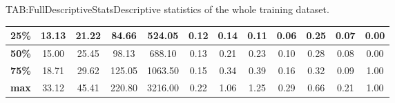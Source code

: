 \begin{landscape}
\begin{table}[Complete Descriptive Statistics]{TAB:FullDescriptiveStats}{Descriptive statistics of the whole training dataset.}
\begin{adjustbox}{width=1\linewidth}
\begin{tabular}{|c|*{11}{c|}}
                \hline
                \textbf{25\%}    & 13.13                           & 21.22                            & 84.66                              & 524.05                        & 0.12                                & 0.14                                 & 0.11                               & 0.06                                    & 0.25                              & 0.07                                       & 0.00                      \\
                \hline
                \textbf{50\%}    & 15.00                           & 25.45                            & 98.13                              & 688.10                        & 0.13                                & 0.21                                 & 0.23                               & 0.10                                    & 0.28                              & 0.08                                       & 0.00                      \\
                \hline
                \textbf{75\%}    & 18.71                           & 29.62                            & 125.05                             & 1063.50                       & 0.15                                & 0.34                                 & 0.39                               & 0.16                                    & 0.32                              & 0.09                                       & 1.00                      \\
                \hline
                \textbf{max}     & 33.12                           & 45.41                            & 220.80                             & 3216.00                       & 0.22                                & 1.06                                 & 1.25                               & 0.29                                    & 0.66                              & 0.21                                       & 1.00                      \\
                \hline
            \end{tabular}
        \end{adjustbox}

    \end{table}


\end{landscape}
